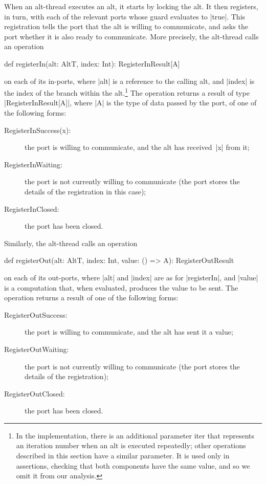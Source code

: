 When an alt-thread executes an alt, it starts by locking the alt.  It then
registers, in turn, with each of the relevant ports whose guard evaluates to
|true|.  This registration tells the port that the alt is willing to
communicate, and asks the port whether it is also ready to communicate.  More
precisely, the alt-thread calls an operation
%
\begin{scala}
def registerIn(alt: AltT, index: Int): RegisterInResult[A]  
\end{scala}
%
on each of its in-ports, where |alt| is a reference to the calling alt, and
|index| is the index of the branch within the alt.\footnote{In the
  implementation, there is an additional parameter {\scalashape iter} that
  represents an iteration number when an alt is executed repeatedly; other
  operations described in this section have a similar parameter.  It is used
  only in assertions, checking that both components have the same value, and
  so we omit it from our analysis.}
The operation returns a
result of type |RegisterInResult[A]|, where |A| is the type of data passed by
the port, of one of the following forms:
%
\begin{description}
\item[\rm{\scalastyle RegisterInSuccess(x)}:] the port is willing to
  communicate, and the alt has received~|x| from it;

\item[\rm{\scalastyle RegisterInWaiting}:] the port is not currently willing
  to communicate (the port stores the details of the registration in this
  case);

\item[\rm{\scalastyle RegisterInClosed}:] the port has been closed.
\end{description}
%
Similarly, the alt-thread calls an operation
%
\begin{scala}
def registerOut(alt: AltT, index: Int, value: () => A): RegisterOutResult
\end{scala}
on each of its out-ports, where |alt| and |index| are as for |registerIn|, and
|value| is a computation that, when evaluated, produces the value to be sent.
The operation returns a result of one of the following forms:
%
\begin{description}
\item[\rm{\scalastyle RegisterOutSuccess}:] the port is willing to
  communicate, and the alt has sent it a value;

\item[\rm{\scalastyle RegisterOutWaiting}:] the port is not currently willing to
  communicate (the port stores the details of the registration); 

\item[\rm{\scalastyle RegisterOutClosed}:] the port has been closed.
\end{description}

